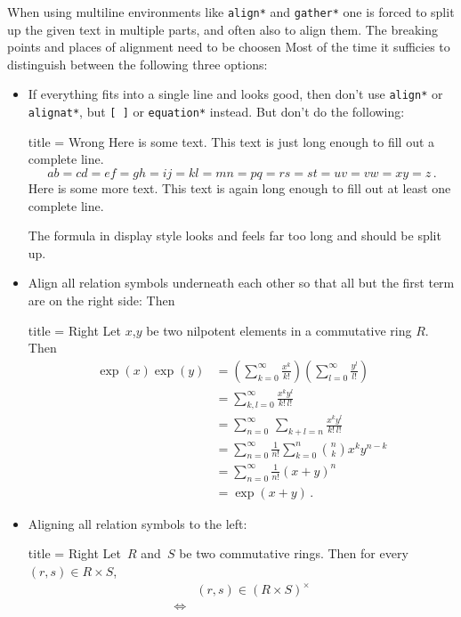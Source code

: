 \documentclass[a4paper, 10pt, headings=standardclasses, oneside, bibliography=totocnumbered]{scrbook}
\begin{document}
When using multiline environments like \texttt{align*} and \texttt{gather*} one is forced to split up the given text in multiple parts, and often also to align them.
The breaking points and places of alignment need to be choosen 
Most of the time it sufficies to distinguish between the following three options:
\begin{itemize}
  \item
    If everything fits into a single line and looks good, then don’t use \texttt{align*} or \texttt{alignat*}, but \texttt{{\tbs}[ {\tbs}]} or \texttt{equation*} instead.
    But don’t do the following:
    \begin{tcblisting}{title = {Wrong}}
Here is some text.
This text is just long enough to fill out a complete line.
\[
  ab = cd = ef = gh = ij = kl = mn = pq = rs = st = uv = vw = xy = z \,.
\]
Here is some more text.
This text is again long enough to fill out at least one complete line.
    \end{tcblisting}
    The formula in display style looks and feels far too long and should be split up.
  \item
    Align all relation symbols underneath each other so that all but the first term are on the right side:
    Then
    \begin{tcblisting}{title = {Right}}
Let $x$,$y$ be two nilpotent elements in a commutative ring $R$.
Then
\begin{align*}
  \exp(x) \exp(y)
  &=
  \left( \sum_{k=0}^\infty \frac{x^k}{k!} \right)
  \left( \sum_{l=0}^\infty \frac{y^l}{l!} \right)
  \\
  &=
  \sum_{k,l=0}^\infty \frac{x^k y^l}{k! \, l!}
  \\
  &=
  \sum_{n=0}^\infty \, \sum_{k+l = n} \frac{x^k y^l}{k! \, l!}
  \\
  &=
  \sum_{n=0}^\infty \frac{1}{n!} \sum_{k=0}^n \binom{n}{k} x^k y^{n-k}
  \\
  &=
  \sum_{n=0}^\infty \frac{1}{n!} (x + y)^n
  \\
  &=
  \exp(x + y) \,.
\end{align*}
    \end{tcblisting}
  \item
    Aligning all relation symbols to the left:
    \begin{tcblisting}{title = {Right}}
Let~$R$ and~$S$ be two commutative rings.
Then for every~$(r,s) \in R \times S$,
\begin{align*}
  {}&
  (r, s) \in (R \times S)^\times
  \\
  \iff{}&

\end{align*}
\end{tcblisting}
\end{itemize}
\end{document}
